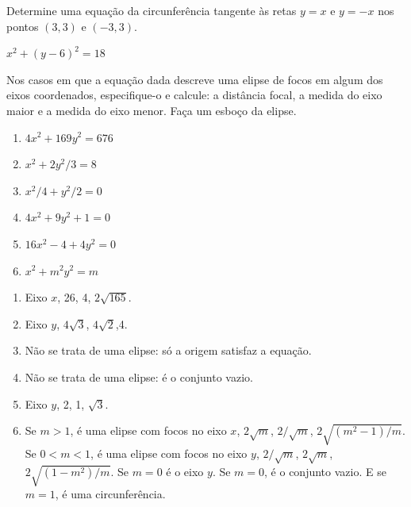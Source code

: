 \documentclass[12pt]{exam}
\begin{document}
\begin{exercicio}
    Determine uma equação da circunferência tangente às retas $y = x$ e $y = -x$ nos pontos $(3,3)$ e $(-3,3)$.
    \begin{solucao}
        $x^2 + (y - 6)^2 = 18$
    \end{solucao}
\end{exercicio}

\begin{exercicio}
    Nos casos em que a equação dada descreve uma elipse de focos em algum dos eixos coordenados, especifique-o e calcule: a distância focal, a medida do eixo maior e a medida do eixo menor. Faça um esboço da elipse.
    \begin{enumerate}[label=({\alph*})]
        \item $4x^2 + 169y^2 = 676$
        \item $x^2 + 2y^2/3 = 8$
        \item $x^2/4 + y^2/2 = 0$
        \item $4x^2 + 9y^2 + 1 = 0$
        \item $16x^2 - 4 + 4y^2 = 0$
        \item $x^2 + m^2y^2 = m$
    \end{enumerate}
    \begin{solucao}
        \begin{enumerate}[label=({\alph*})]
            \item Eixo $x$, 26, 4, $2\sqrt{165}$.
            \item Eixo $y$, $4\sqrt{3}$, $4\sqrt{2}$,4.
            \item Não se trata de uma elipse: só a origem satisfaz a equação.
            \item Não se trata de uma elipse: é o conjunto vazio.
            \item Eixo $y$, 2, 1, $\sqrt{3}$.
            \item Se $m > 1$, é uma elipse com focos no eixo $x$, $2\sqrt{m}$, $2/\sqrt{m}$, $2\sqrt{(m^2 - 1)/m}$.
                  Se $0 < m < 1$, é uma elipse com focos no eixo $y$, $2/\sqrt{m}$, $2\sqrt{m}$, $2\sqrt{(1 - m^2)/m}$.
                  Se $m = 0$ é o eixo $y$. Se $m = 0$, é o conjunto vazio. E se $m = 1$, é uma circunferência.
        \end{enumerate}
    \end{solucao}
\end{exercicio}

\end{document}
